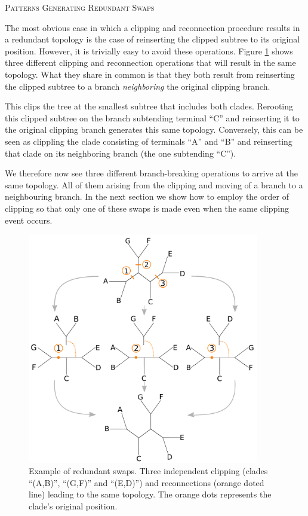 \documentclass[12pt,letterpaper]{article}
\renewcommand{\section}[1]{%
\bigskip
\begin{center}
\begin{Large}
\normalfont\scshape #1
\medskip
\end{Large}
\end{center}}
\begin{document}
\section{Patterns Generating Redundant Swaps}
The most obvious case in which a clipping and reconnection procedure results in a redundant topology is the case of reinserting the clipped subtree to its original position.
However, it is trivially easy to avoid these operations.
Figure \ref{Figure_redundant} shows three different clipping and reconnection operations that will result in the same topology. 
What they share in common is that they both result from reinserting the clipped subtree to a branch \textit{neighboring} the original clipping branch.

This clips the tree at the smallest subtree that includes both clades. %
Rerooting this clipped subtree on the branch subtending terminal ``C'' and reinserting it to the original clipping branch generates this same topology.
Conversely, this can be seen as clippling the clade consisting of terminals ``A'' and ``B'' and reinserting that clade on its neighboring branch (the one subtending ``C'').

We therefore now see three different branch-breaking operations to arrive at the same topology. 
All of them arising from the clipping and moving of a branch to a neighbouring branch.
In the next section we show how to employ the order of clipping so that only one of these swaps is made even when the same clipping event occurs.

\begin{figure}[!htbp]
\centering
   \includegraphics[width=0.9\textwidth]{Figure/Figure_RedundantSwaps.pdf}
\caption{Example of redundant swaps. Three independent clipping (clades ``(A,B)'', ``(G,F)'' and ``(E,D)'') and reconnections (orange doted line) leading to the same topology. The orange dots represents the clade's original position.}
\label{Figure_redundant}
\end{figure}
\end{document}
